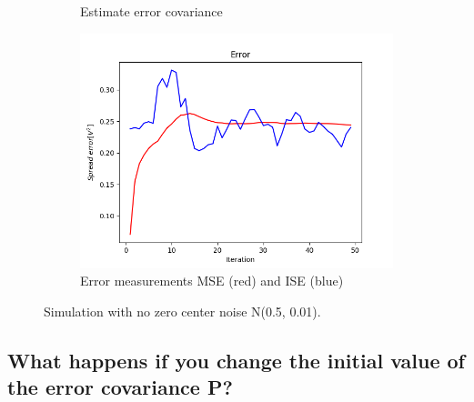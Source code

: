 \documentclass{article}
\begin{document}
\begin{figure}
\begin{subfigure} {.5\textwidth}
                \caption{Estimate error covariance}
            \end{subfigure}
            \begin{subfigure}{.5\textwidth}            
                \centering
                \includegraphics[width=0.8\linewidth]{./img/nc_E.png}
                \caption{Error measurements MSE (red) and ISE (blue)}
            \end{subfigure}
            \caption{Simulation with no zero center noise N(0.5, 0.01).}
            \label{fig:simulation6}
        \end{figure}
    
    \subsection{What happens if you change the initial value of the error covariance P?}
\end{document}
